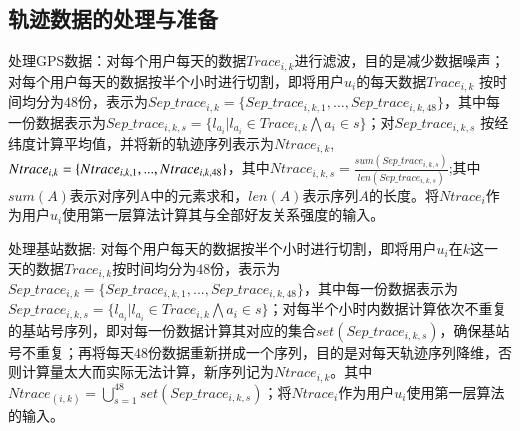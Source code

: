 \subsection{轨迹数据的处理与准备}
处理GPS数据：对每个用户每天的数据$Trace_{i,k}$进行滤波，目的是减少数据噪声；对每个用户每天的数据按半个小时进行切割，即将用户$u_{i}$的每天数据$Trace_{i,k}$ 按时间均分为$48$份，表示为$Sep\_trace_{i,k}=\{Sep\_trace_{i,k,1},...,Sep\_trace_{i,k,48}\}$，其中每一份数据表示为$Sep\_trace_{i,k,s}=\{l_{a_i}|l_{a_i}\in Trace_{i,k} \bigwedge a_{i} \in s\}$；对$Sep\_trace_{i,k,s}$ 按经纬度计算平均值，并将新的轨迹序列表示为$Ntrace_{i,k}$,$Ntrace_{i,k}=\{Ntrace_{i,k,1},...,\\
Ntrace_{i,k,48}\}$，其中$Ntrace_{i,k,s}=\frac{sum(Sep\_trace_{i,k,s})}{len(Sep\_trace_{i,k,s})}$;其中$sum(A)$表示对序列A中的元素求和，$len(A)$表示序列$A$的长度。将$Ntrace_{i}$作为用户$u_{i}$使用第一层算法计算其与全部好友关系强度的输入。
\par 处理基站数据: 对每个用户每天的数据按半个小时进行切割，即将用户$u_{i}$在$k$这一天的数据$Trace_{i,k}$按时间均分为$48$份，表示为$Sep\_trace_{i,k}=\{Sep\_trace_{i,k,1},...,Sep\_trace_{i,k,48}\}$，其中每一份数据表示为$Sep\_trace_{i,k,s}=\{l_{a_i}|l_{a_i}\in Trace_{i,k}\bigwedge a_{i}\in s\}$；对每半个小时内数据计算依次不重复的基站号序列，即对每一份数据计算其对应的集合$set(Sep\_trace_{i,k,s})$，确保基站号不重复；再将每天$48$份数据重新拼成一个序列，目的是对每天轨迹序列降维，否则计算量太大而实际无法计算，新序列记为$Ntrace_{i,k}$。其中$Ntrace_(i,k)=\bigcup_{s=1}^{48}set(Sep\_trace_{i,k,s})$；将$Ntrace_{i}$作为用户$u_{i}$使用第一层算法的输入。
